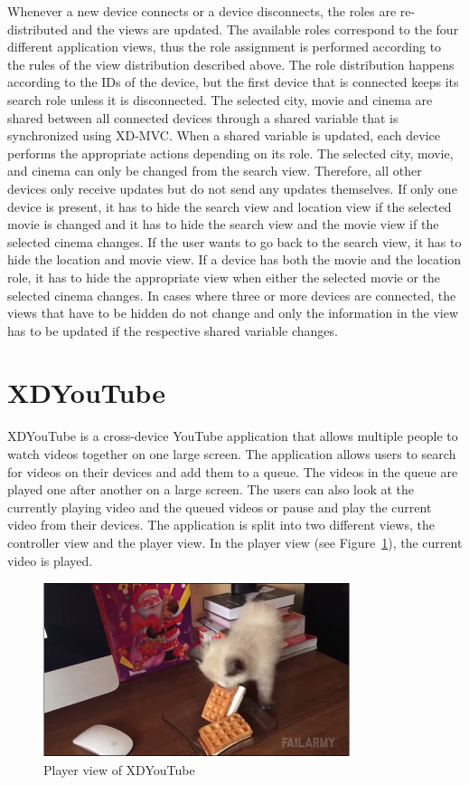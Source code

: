 Whenever a new device connects or a device disconnects, the roles are re-distributed and the views are updated. The available roles correspond to the four different application views, thus the role assignment is performed according to the rules of the view distribution described above. The role distribution happens according to the IDs of the device, but the first device that is connected keeps its search role unless it is disconnected. The selected city, movie and cinema are shared between all connected devices through a shared variable that is synchronized using XD-MVC. When a shared variable is updated, each device performs the appropriate actions depending on its role. The selected city, movie, and cinema can only be changed from the search view. Therefore, all other devices only receive updates but do not send any updates themselves. If only one device is present, it has to hide the search view and location view if the selected movie is changed and it has to hide the search view and the movie view if the selected cinema changes. If the user wants to go back to the search view, it has to hide the location and movie view. If a device has both the movie and the location role, it has to hide the appropriate view when either the selected movie or the selected cinema changes. In cases where three or more devices are connected, the views that have to be hidden do not change and only the information in the view has to be updated if the respective shared variable changes. 

\section{XDYouTube}

XDYouTube is a cross-device YouTube application that allows multiple people to watch videos together on one large screen. The application allows users to search for videos on their devices and add them to a queue. The videos in the queue are played one after another on a large screen. The users can also look at the currently playing video and the queued videos or pause and play the current video from their devices. The application is split into two different views, the controller view and the player view. In the player view (see Figure~\ref{fig:xdyt_player}), the current video is played. 

\begin{figure}[H]
  \centering
    \includegraphics[width=0.8\textwidth]{images/screenshots/xdyt/player.png}
	\caption[Screenshot XDYouTube: Player view]{Player view of XDYouTube}
	\label{fig:xdyt_player}
\end{figure}


